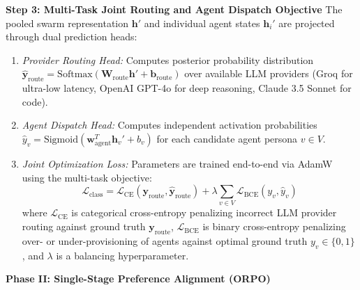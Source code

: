 \documentclass[11pt,a4paper]{article}
\begin{document}
\vspace{0.08em}
\textbf{Step 3: Multi-Task Joint Routing and Agent Dispatch Objective}
The pooled swarm representation $\mathbf{h}'$ and individual agent states $\mathbf{h}_i'$ are projected through dual prediction heads:
\begin{enumerate}[leftmargin=1.8em, itemsep=0.06em, topsep=0.02em]
    \item \textit{Provider Routing Head:} Computes posterior probability distribution $\hat{\mathbf{y}}_{\text{route}} = \mathrm{Softmax}(\mathbf{W}_{\text{route}} \mathbf{h}' + \mathbf{b}_{\text{route}})$ over available LLM providers (Groq for ultra-low latency, OpenAI GPT-4o for deep reasoning, Claude 3.5 Sonnet for code).
    \item \textit{Agent Dispatch Head:} Computes independent activation probabilities $\hat{y}_v = \mathrm{Sigmoid}(\mathbf{w}_{\text{agent}}^T \mathbf{h}_v' + b_v)$ for each candidate agent persona $v \in V$.
    \item \textit{Joint Optimization Loss:} Parameters are trained end-to-end via AdamW using the multi-task objective:
    \begin{equation}
    \mathcal{L}_{\text{class}} = \mathcal{L}_{\text{CE}}(\mathbf{y}_{\text{route}}, \hat{\mathbf{y}}_{\text{route}}) + \lambda \sum_{v \in V} \mathcal{L}_{\text{BCE}}(y_v, \hat{y}_v)
    \end{equation}
    where $\mathcal{L}_{\text{CE}}$ is categorical cross-entropy penalizing incorrect LLM provider routing against ground truth $\mathbf{y}_{\text{route}}$, $\mathcal{L}_{\text{BCE}}$ is binary cross-entropy penalizing over- or under-provisioning of agents against optimal ground truth $y_v \in \{0, 1\}$, and $\lambda$ is a balancing hyperparameter.
\end{enumerate}

\clearpage


\textbf{Phase II: Single-Stage Preference Alignment (ORPO)}
\end{document}
